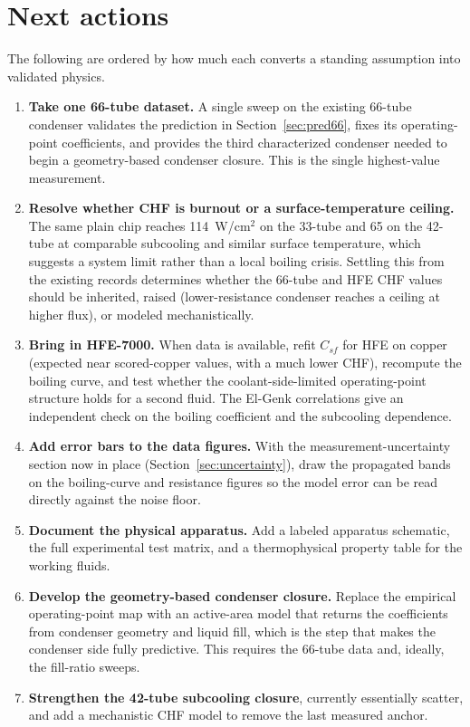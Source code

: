 \documentclass[11pt]{article}
\begin{document}
\section{Next actions}
The following are ordered by how much each converts a standing assumption into validated physics.
\begin{enumerate}
\item \textbf{Take one 66-tube dataset.} A single sweep on the existing 66-tube condenser validates
the prediction in Section~\ref{sec:pred66}, fixes its operating-point coefficients, and provides the
third characterized condenser needed to begin a geometry-based condenser closure. This is the single
highest-value measurement.
\item \textbf{Resolve whether CHF is burnout or a surface-temperature ceiling.} The same plain chip
reaches 114~W/cm$^2$ on the 33-tube and 65 on the 42-tube at comparable subcooling and similar
surface temperature, which suggests a system limit rather than a local boiling crisis. Settling this
from the existing records determines whether the 66-tube and HFE CHF values should be inherited,
raised (lower-resistance condenser reaches a ceiling at higher flux), or modeled mechanistically.
\item \textbf{Bring in HFE-7000.} When data is available, refit $C_{sf}$ for HFE on copper (expected
near scored-copper values, with a much lower CHF), recompute the boiling curve, and test whether the
coolant-side-limited operating-point structure holds for a second fluid. The El-Genk correlations
give an independent check on the boiling coefficient and the subcooling dependence.
\item \textbf{Add error bars to the data figures.} With the measurement-uncertainty section now in
place (Section~\ref{sec:uncertainty}), draw the propagated bands on the boiling-curve and resistance
figures so the model error can be read directly against the noise floor.
\item \textbf{Document the physical apparatus.} Add a labeled apparatus schematic, the full
experimental test matrix, and a thermophysical property table for the working fluids.
\item \textbf{Develop the geometry-based condenser closure.} Replace the empirical operating-point
map with an active-area model that returns the coefficients from condenser geometry and liquid fill,
which is the step that makes the condenser side fully predictive. This requires the 66-tube data and,
ideally, the fill-ratio sweeps.
\item \textbf{Strengthen the 42-tube subcooling closure}, currently essentially scatter, and add a
mechanistic CHF model to remove the last measured anchor.
\end{enumerate}
\end{document}
